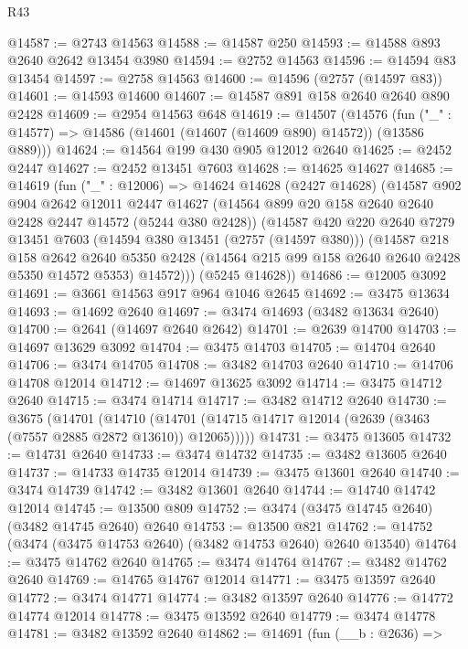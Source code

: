 \begin{lexlean}{R43}
\begin{coremodule}
@14587 := @2743 @14563
@14588 := @14587 @250
@14593 := @14588 @893 @2640 @2642 @13454 @3980
@14594 := @2752 @14563
@14596 := @14594 @83 @13454
@14597 := @2758 @14563
@14600 := @14596 (@2757 (@14597 @83))
@14601 := @14593 @14600
@14607 := @14587 @891 @158 @2640 @2640 @890 @2428
@14609 := @2954 @14563 @648
@14619 := @14507
    (@14576 (fun ("_" : @14577) => @14586 (@14601 (@14607 (@14609 @890) @14572)) (@13586 @889)))
@14624 := @14564 @199 @430 @905 @12012 @2640
@14625 := @2452 @2447
@14627 := @2452 @13451 @7603
@14628 := @14625 @14627
@14685 := @14619
    (fun ("_" : @12006) =>
    @14624
      @14628
      (@2427 @14628)
      (@14587
        @902
        @904
        @2642
        @12011
        @2447
        @14627
        (@14564 @899 @20 @158 @2640 @2640 @2428 @2447 @14572 (@5244 @380 @2428))
        (@14587
          @420
          @220
          @2640
          @7279
          @13451
          @7603
          (@14594 @380 @13451 (@2757 (@14597 @380)))
          (@14587
            @218
            @158
            @2642
            @2640
            @5350
            @2428
            (@14564 @215 @99 @158 @2640 @2640 @2428 @5350 @14572 @5353)
            @14572)))
      (@5245 @14628))
@14686 := @12005 @3092
@14691 := @3661 @14563 @917 @964 @1046 @2645
@14692 := @3475 @13634
@14693 := @14692 @2640
@14697 := @3474 @14693 (@3482 @13634 @2640)
@14700 := @2641 (@14697 @2640 @2642)
@14701 := @2639 @14700
@14703 := @14697 @13629 @3092
@14704 := @3475 @14703
@14705 := @14704 @2640
@14706 := @3474 @14705
@14708 := @3482 @14703 @2640
@14710 := @14706 @14708 @12014
@14712 := @14697 @13625 @3092
@14714 := @3475 @14712 @2640
@14715 := @3474 @14714
@14717 := @3482 @14712 @2640
@14730 := @3675
    (@14701
      (@14710 (@14701 (@14715 @14717 @12014 (@2639 (@3463 (@7557 @2885 @2872 @13610)) @12065)))))
@14731 := @3475 @13605
@14732 := @14731 @2640
@14733 := @3474 @14732
@14735 := @3482 @13605 @2640
@14737 := @14733 @14735 @12014
@14739 := @3475 @13601 @2640
@14740 := @3474 @14739
@14742 := @3482 @13601 @2640
@14744 := @14740 @14742 @12014
@14745 := @13500 @809
@14752 := @3474 (@3475 @14745 @2640) (@3482 @14745 @2640) @2640
@14753 := @13500 @821
@14762 := @14752 (@3474 (@3475 @14753 @2640) (@3482 @14753 @2640) @2640 @13540)
@14764 := @3475 @14762 @2640
@14765 := @3474 @14764
@14767 := @3482 @14762 @2640
@14769 := @14765 @14767 @12014
@14771 := @3475 @13597 @2640
@14772 := @3474 @14771
@14774 := @3482 @13597 @2640
@14776 := @14772 @14774 @12014
@14778 := @3475 @13592 @2640
@14779 := @3474 @14778
@14781 := @3482 @13592 @2640
@14862 := @14691
    (fun (__b : @2636) =>

\end{coremodule}
\end{lexlean}

